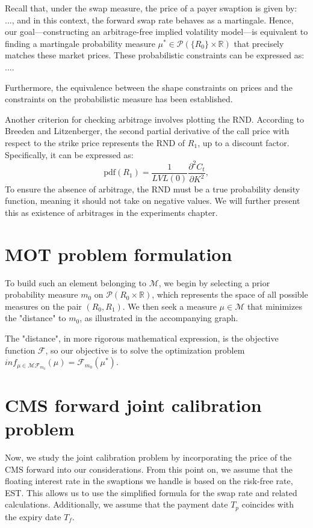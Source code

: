 Recall that, under the swap measure, the price of a payer swaption is given by: ..., and in this context, 
the forward swap rate behaves as a martingale. Hence, our goal—constructing an arbitrage-free implied volatility 
model—is equivalent to finding a martingale probability measure 
\(\mu^{*} \in \mathcal{P}(\{R_{0}\} \times \mathbb{R})\) that precisely matches these market prices. 
These probabilistic constraints can be expressed as: $...$. 

Furthermore, the equivalence between the shape constraints on prices and the constraints on the 
probabilistic measure has been established.

Another criterion for checking arbitrage involves plotting the RND. 
According to Breeden and Litzenberger, the second partial derivative of the call price with respect to the 
strike price represents the RND of \( R_1 \), up to a discount factor. 
Specifically, it can be expressed as:
$$
\text{pdf}(R_1) = \frac{1}{LVL(0)}\frac{\partial^{2} C_{t}}{\partial K^{2}},
$$
To ensure the absence of arbitrage, the RND must be a true probability density function, 
meaning it should not take on negative values. 
We will further present this as existence of arbitrages in the experiments chapter.

\section{MOT problem formulation}

To build such an element belonging to \(\mathcal{M}\), we begin by selecting a prior probability measure \(m_0\) 
on \(\mathcal{P}(R_{0} \times \mathbb{R})\), which represents the space of all possible measures on the pair 
\((R_0, R_1)\). We then seek a measure \(\mu \in \mathcal{M}\) that minimizes the "distance" to \(m_0\), 
as illustrated in the accompanying graph. 

The "distance", in more rigorous mathematical expression, is the objective function $\mathcal{F}$, so our objective
is to solve the optimization problem $inf_{\mu \in \mathcal{M} \mathcal{F}_{m_0}}(\mu) = \mathcal{F}_{m_0}(\mu^{*})$.

\section{CMS forward joint calibration problem}
Now, we study the joint calibration problem by incorporating the price of the CMS forward into our considerations. 
From this point on, we assume that the floating interest rate in the swaptions we handle is based on the risk-free rate, EST. 
This allows us to use the simplified formula for the swap rate and related calculations. Additionally, we assume that the payment date \(T_p\) 
coincides with the expiry date \(T_f\).

